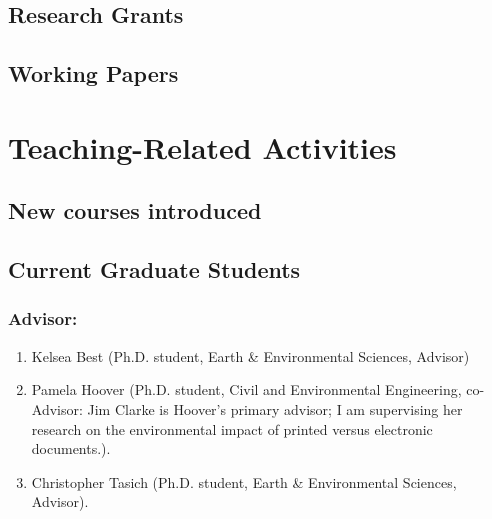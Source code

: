 \documentclass[10pt]{article}
\begin{document}
    \subsection{Research Grants}
    
\iffalse
    \subsection{Creative Expression}
    
\fi
%
\iftrue
    \subsection{Working Papers} %
    
\fi


\iftrue
\section{Teaching-Related Activities}
    \subsection{New courses introduced}
    
    \subsection{Current Graduate Students}
    \subsubsection{Advisor:}
    \begin{enumerate}
    \item Kelsea Best (Ph.D. student, Earth \& Environmental Sciences, Advisor)
    \item Pamela Hoover (Ph.D. student, Civil and Environmental Engineering, co-Advisor: Jim Clarke is Hoover's primary advisor; I am supervising her research on the environmental impact of printed versus electronic documents.).
    \item Christopher Tasich (Ph.D. student, Earth \& Environmental Sciences, Advisor).
    \end{enumerate}
\end{document}
